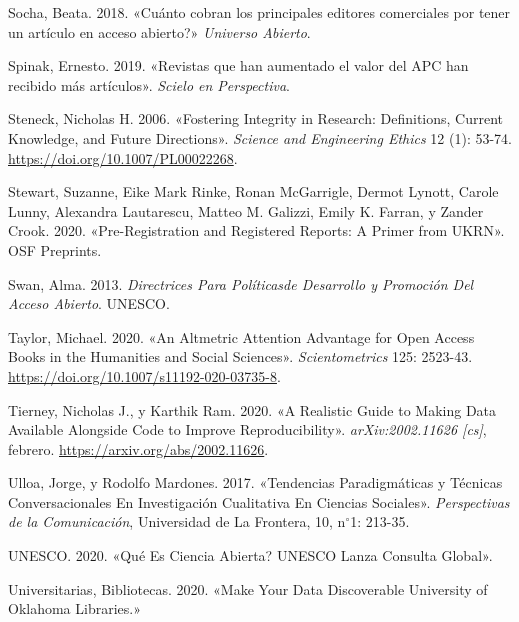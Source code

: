 \documentclass[
  spanish,
  a4paper,
  oneside]{scrbook}
\newlength{\cslhangindent}
\newenvironment{CSLReferences}[2] %
 {\begin{list}{}{%
  \setlength{\itemindent}{0pt}
  \setlength{\leftmargin}{0pt}
  \setlength{\parsep}{0pt}
  \ifodd #1
   \setlength{\leftmargin}{\cslhangindent}
   \setlength{\itemindent}{-1\cslhangindent}
  \fi
  \setlength{\itemsep}{#2\baselineskip}}}
 {\end{list}}
\begin{document}
\begin{CSLReferences}{1}{0}
Socha, Beata. 2018. {«{{\textquestiondown}Cu{á}nto cobran los
principales editores comerciales por tener un art{í}culo en acceso
abierto?}»} \emph{Universo Abierto}.

Spinak, Ernesto. 2019. {«{Revistas que han aumentado el valor del APC
han recibido m{á}s art{í}culos}»}. \emph{Scielo en Perspectiva}.

Steneck, Nicholas H. 2006. {«Fostering Integrity in Research:
{Definitions}, Current Knowledge, and Future Directions»}. \emph{Science
and Engineering Ethics} 12 (1): 53-74.
\url{https://doi.org/10.1007/PL00022268}.

Stewart, Suzanne, Eike Mark Rinke, Ronan McGarrigle, Dermot Lynott,
Carole Lunny, Alexandra Lautarescu, Matteo M. Galizzi, Emily K. Farran,
y Zander Crook. 2020. {«Pre-Registration and {Registered Reports}: A
{Primer} from {UKRN}»}. OSF Preprints.

Swan, Alma. 2013. \emph{Directrices Para Pol{í}ticasde Desarrollo y
Promoci{ó}n Del Acceso Abierto}. UNESCO.

Taylor, Michael. 2020. {«An Altmetric Attention Advantage for Open
Access Books in the Humanities and Social Sciences»}.
\emph{Scientometrics} 125: 2523-43.
\url{https://doi.org/10.1007/s11192-020-03735-8}.

Tierney, Nicholas J., y Karthik Ram. 2020. {«A {Realistic Guide} to
{Making Data Available Alongside Code} to {Improve Reproducibility}»}.
\emph{arXiv:2002.11626 {[}cs{]}}, febrero.
\url{https://arxiv.org/abs/2002.11626}.

Ulloa, Jorge, y Rodolfo Mardones. 2017. {«Tendencias Paradigm{á}ticas y
T{é}cnicas Conversacionales En Investigaci{ó}n {Cualitativa} En
{Ciencias Sociales}»}. \emph{Perspectivas de la Comunicaci{ó}n},
Universidad de La {Frontera}, 10, n{\(^\circ\)}1: 213-35.

UNESCO. 2020. {«Qu{é} {Es Ciencia Abierta}? {UNESCO Lanza Consulta
Global}»}.

Universitarias, Bibliotecas. 2020. {«Make {Your Data Discoverable}
{\textbar} {University} of {Oklahoma Libraries}.»}


\end{CSLReferences}
\end{document}
